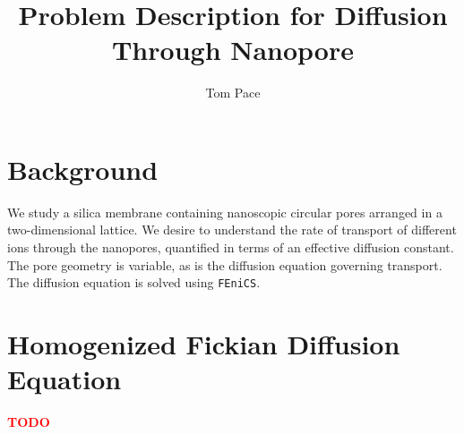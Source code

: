 \documentclass{article}
\begin{document}
\title{Problem Description for Diffusion Through Nanopore}
\author{Tom Pace}
\maketitle

\tableofcontents

\section{Background}\label{sec:background}

We study a silica membrane containing nanoscopic circular pores arranged in a two-dimensional lattice.
We desire to understand the rate of transport of different ions through the nanopores,
quantified in terms of an effective diffusion constant.
The pore geometry is variable, as is the diffusion equation governing transport.
The diffusion equation is solved using \texttt{FEniCS}.









\section{Homogenized Fickian Diffusion Equation}\label{sec:hom_fick}

\textcolor{red}{\textbf{TODO}}

\printbibliography
\end{document}
